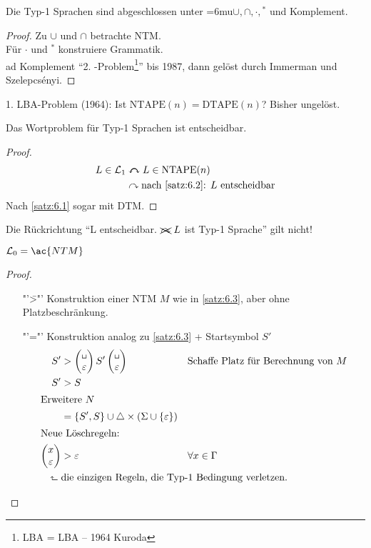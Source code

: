 {\begin{Satz}
	Die Typ-1 Sprachen sind abgeschlossen unter {\thinmuskip=6mu$\cup,\cap,\cdot,{}^*$} und Komplement.
\end{Satz}
\begin{proof}
	Zu $\cup$ und $\cap$ betrachte \ac{NTM}.\\
	Für $\cdot$ und $^*$ konstruiere Grammatik.\\
	ad Komplement "`2. -Problem\footnote{\acs*{LBA} = \acl*{LBA} -- 1964 Kuroda}"' bis 1987, dann gelöst durch Immerman und Szelepcsényi.
\end{proof}
\begin{Bemerkung}
  1. \ac{LBA}-Problem (1964): Ist $\mathrm{NTAPE}(n) = \mathrm{DTAPE}(n)$? Bisher ungelöst.
\end{Bemerkung}
\begin{Satz}
	Das Wortproblem für Typ-1 Sprachen ist entscheidbar.
\end{Satz}
\begin{proof}
	\begin{align*}
		L\in\mathcal{L}_1 &\curvearrowleftright L\in\mathrm{NTAPE}(n)\\
		&\curvearrowright \text{nach \autoref{satz:6.2}: $L$ entscheidbar}
	\end{align*}
	Nach \autoref{satz:6.1} sogar mit \ac{DTM}.
\end{proof}
Die Rückrichtung "`L entscheidbar. $\xcancel{\curvearrowright}\ L$ ist Typ-1 Sprache"' gilt nicht!

\begin{Satz}\label{satz:6.6}
	$\mathcal{L}_0 = \ac{NTM}$
\end{Satz}
\begin{proof}
	\begin{itemize}
	\item["'\=>"'] Konstruktion einer \ac{NTM} $M$ wie in \autoref{satz:6.3}, aber ohne Platzbeschränkung.
	\item["'\<="'] Konstruktion analog zu \autoref{satz:6.3} + Startsymbol $S'$
	\begin{align*}
		S' &\-> \pmqty{\blank\\\Eps} S' \pmqty{\blank\\\Eps} &&\text{Schaffe Platz für Berechnung von }M\\
		S' &\-> S\\
	\shortintertext{Erweitere $N$}
		&= \{S',S\}\cup\triangle\x(\Sigma\cup\{\Eps\})\\
	\shortintertext{Neue Löschregeln:}
		\pmqty{x\\ \Eps } &\-> \Eps &&\forall x\in\Gamma\\
		\rotatebox{90}{$\Rsh$}\ &\mathrlap{\text{die einzigen
                                          Regeln, die Typ-1 Bedingung verletzen.}} \tag*{\qedhere}
	\end{align*}
	\end{itemize}
\end{proof}

}
